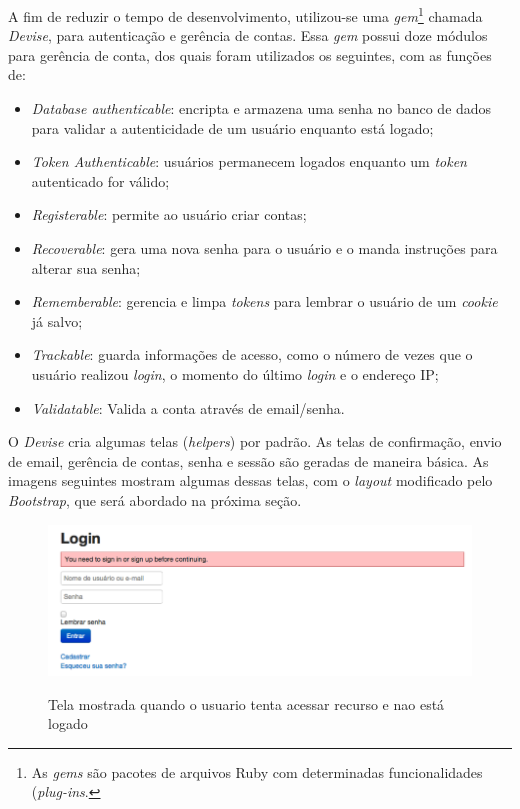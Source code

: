             A fim de reduzir o tempo de desenvolvimento, utilizou-se uma \emph{gem}\footnote{As \emph{gems} são pacotes de arquivos Ruby com determinadas funcionalidades (\emph{plug-ins}.} chamada \emph{Devise}, para autenticação e gerência de contas. Essa \emph{gem} possui doze módulos para gerência de conta, dos quais foram utilizados os seguintes, com as funções de:
\begin{itemize}
\item \emph{Database authenticable}: encripta e armazena uma senha no banco de dados para validar a autenticidade de um usuário enquanto está logado;
\item \emph{Token Authenticable}: usuários permanecem logados enquanto um \emph{token} autenticado for válido;
\item \emph{Registerable}: permite ao usuário criar contas;
\item \emph{Recoverable}: gera uma nova senha para o usuário e o manda instruções para alterar sua senha;
\item \emph{Rememberable}: gerencia e limpa \emph{tokens} para lembrar o usuário de um \emph{cookie} já salvo;
\item \emph{Trackable}: guarda informações de acesso, como o número de vezes que o usuário realizou \emph{login}, o momento do último \emph{login} e o endereço IP;
\item \emph{Validatable}: Valida a conta através de email/senha.
\end{itemize}   
  
    O \emph{Devise} cria algumas telas (\emph{helpers}) por padrão. As telas de confirmação, envio de email, gerência de contas, senha e sessão são geradas de maneira básica. As imagens seguintes mostram algumas dessas telas, com o \emph{layout} modificado pelo \emph{Bootstrap}, que será abordado na próxima seção.
	 \begin{figure}[H]
	   \centering
	   \includegraphics{figs/railslogin.png}\\
	   \caption{ Tela mostrada quando o usuario tenta acessar recurso e nao está logado }
	   \label{FIG:railslogin}
	 \end{figure}
	 
